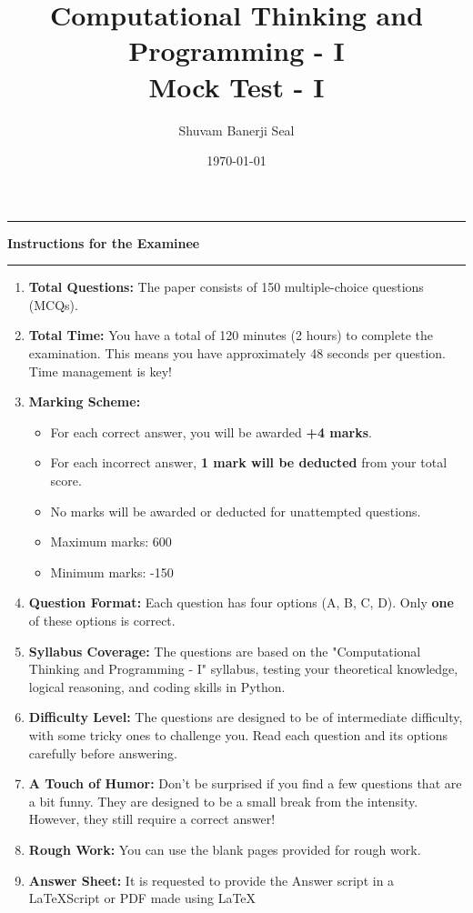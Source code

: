 \documentclass[9pt]{article}
\author{Shuvam Banerji Seal}
\title{Computational Thinking and Programming - I \\ Mock Test - I}
\date{\today}
\begin{document}
\maketitle

\begin{center}
\hrule
\vspace{1em}
\textbf{Instructions for the Examinee}
\vspace{1em}
\hrule
\end{center}

\begin{enumerate}
\item \textbf{Total Questions:} The paper consists of 150 multiple-choice questions (MCQs).
\item \textbf{Total Time:} You have a total of 120 minutes (2 hours) to complete the examination. This means you have approximately 48 seconds per question. Time management is key!
\item \textbf{Marking Scheme:}
\begin{itemize}
\item For each correct answer, you will be awarded \textbf{+4 marks}.
\item For each incorrect answer, \textbf{1 mark will be deducted} from your total score.
\item No marks will be awarded or deducted for unattempted questions.
\item Maximum marks: 600
\item Minimum marks: -150
\end{itemize}
\item \textbf{Question Format:} Each question has four options (A, B, C, D). Only \textbf{one} of these options is correct.
\item \textbf{Syllabus Coverage:} The questions are based on the "Computational Thinking and Programming - I" syllabus, testing your theoretical knowledge, logical reasoning, and coding skills in Python.
\item \textbf{Difficulty Level:} The questions are designed to be of intermediate difficulty, with some tricky ones to challenge you. Read each question and its options carefully before answering.
\item \textbf{A Touch of Humor:} Don't be surprised if you find a few questions that are a bit funny. They are designed to be a small break from the intensity. However, they still require a correct answer!
\item \textbf{Rough Work:} You can use the blank pages provided for rough work.
\item \textbf{Answer Sheet:} It is requested to provide the Answer script in a \LaTeX  Script or PDF made using \LaTeX
\end{enumerate}
\end{document}
